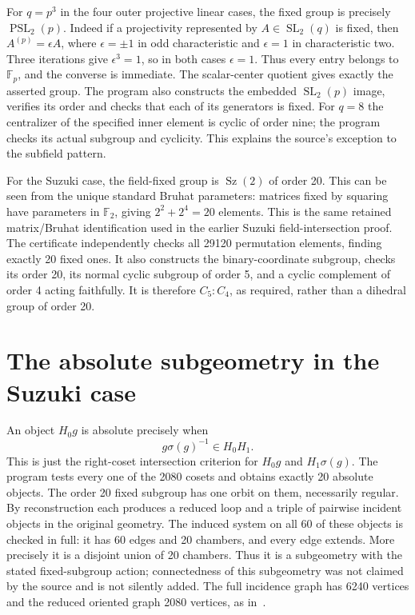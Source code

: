 \documentclass[11pt,a4paper]{article}
\begin{document}
For $q=p^3$ in the four outer projective linear cases, the fixed group is
precisely $\operatorname{PSL}_2(p)$. Indeed if a projectivity represented by
$A\in\operatorname{SL}_2(q)$ is fixed, then $A^{(p)}=\epsilon A$, where
$\epsilon=\pm1$ in odd characteristic and $\epsilon=1$ in characteristic
two. Three iterations give $\epsilon^3=1$, so in both cases $\epsilon=1$.
Thus every entry belongs to $\mathbb F_p$, and the converse is immediate.
The scalar-center quotient gives exactly the asserted group. The program
also constructs the embedded $\operatorname{SL}_2(p)$ image, verifies its
order and checks that each of its generators is fixed.
For $q=8$ the centralizer of the specified inner element is cyclic of order
nine; the program checks its actual subgroup and cyclicity. This explains
the source's exception to the subfield pattern.

For the Suzuki case, the field-fixed group is $\operatorname{Sz}(2)$ of
order 20. This can be seen from the unique standard Bruhat parameters:
matrices fixed by squaring have parameters in $\mathbb F_2$, giving
$2^2+2^4=20$ elements. This is the same retained matrix/Bruhat identification
used in the earlier Suzuki field-intersection proof. The certificate independently checks all 29120 permutation elements, finding
exactly 20 fixed ones. It also constructs the binary-coordinate subgroup, checks its order 20, its normal
cyclic subgroup of order 5, and a cyclic complement of order 4 acting faithfully.
It is therefore $C_5:C_4$, as required, rather than a dihedral group of order 20.

\section{The absolute subgeometry in the Suzuki case}
An object $H_0g$ is absolute precisely when
\[
 g\sigma(g)^{-1}\in H_0H_1.
\]
This is just the right-coset intersection criterion for $H_0g$ and
$H_1\sigma(g)$. The program tests every one of the 2080 cosets and obtains
exactly 20 absolute objects. The order 20 fixed subgroup has one orbit on them,
necessarily regular. By reconstruction each produces a reduced loop and a
triple of pairwise incident objects in the original geometry.
The induced system on all 60 of these objects is checked in full: it has
60 edges and 20 chambers, and every edge extends. More precisely it is a
disjoint union of 20 chambers. Thus it is a subgeometry with the stated
fixed-subgroup action; connectedness of this subgeometry was not claimed by
the source and is not silently added. The full incidence graph has 6240
vertices and the reduced oriented graph 2080 vertices, as in~\cite{LS}.
\end{document}
